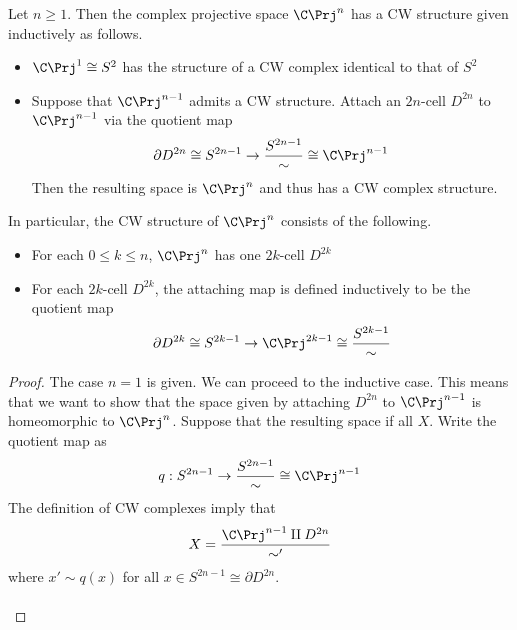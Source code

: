 \documentclass[a4paper]{article}
\begin{document}
\begin{prp}{}{} Let $n\geq 1$. Then the complex projective space $\C\Prj^n$ has a CW structure given inductively as follows. 
\begin{itemize}
\item $\C\Prj^1\cong S^2$ has the structure of a CW complex identical to that of $S^2$
\item Suppose that $\C\Prj^{n-1}$ admits a CW structure. Attach an $2n$-cell $D^{2n}$ to $\C\Prj^{n-1}$ via the quotient map $$\partial D^{2n}\cong S^{2n-1}\to\frac{S^{2n-1}}{\sim}\cong\C\Prj^{n-1}$$ Then the resulting space is $\C\Prj^n$ and thus has a CW complex structure. 
\end{itemize}
In particular, the CW structure of $\C\Prj^n$ consists of the following. 
\begin{itemize}
\item For each $0\leq k\leq n$, $\C\Prj^n$ has one $2k$-cell $D^{2k}$
\item For each $2k$-cell $D^{2k}$, the attaching map is defined inductively to be the quotient map $$\partial D^{2k}\cong S^{2k-1}\to\C\Prj^{2k-1}\cong\frac{S^{2k-1}}{\sim}$$
\end{itemize} \tcbline
\begin{proof}
The case $n=1$ is given. We can proceed to the inductive case. This means that we want to show that the space given by attaching $D^{2n}$ to $\C\Prj^{n-1}$ is homeomorphic to $\C\Prj^n$. Suppose that the resulting space if all $X$. Write the quotient map as $$q:S^{2n-1}\to\frac{S^{2n-1}}{\sim}\cong\C\Prj^{n-1}$$ The definition of CW complexes imply that $$X=\frac{\C\Prj^{n-1}\amalg D^{2n}}{\sim'}$$ where $x'\sim q(x)$ for all $x\in S^{2n-1}\cong\partial D^{2n}$. \\~\\


\end{proof}
\end{prp}
\end{document}
